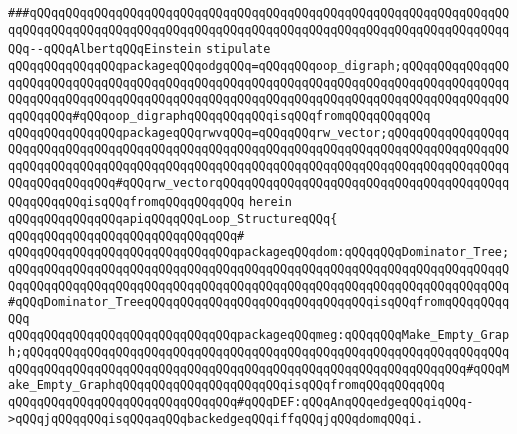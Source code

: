 \verb|###qQQqqQQqqQQqqQQqqQQqqQQqqQQqqQQqqQQqqQQqqQQqqQQqqQQqqQQqqQQqqQQqqQQqqQQqqQQqqQQqqQQqqQQqqQQqqQQqqQQqqQQqqQQqqQQqqQQqqQQqqQQqqQQqqQQqqQQqqQQq--qQQqAlbertqQQqEinstein|\newline
\newline
\newline
\verb|stipulate|\newline
\verb|qQQqqQQqqQQqqQQqpackageqQQqodgqQQq=qQQqqQQqoop_digraph;qQQqqQQqqQQqqQQqqQQqqQQqqQQqqQQqqQQqqQQqqQQqqQQqqQQqqQQqqQQqqQQqqQQqqQQqqQQqqQQqqQQqqQQqqQQqqQQqqQQqqQQqqQQqqQQqqQQqqQQqqQQqqQQqqQQqqQQqqQQqqQQqqQQqqQQqqQQqqQQqqQQq#qQQqoop_digraphqQQqqQQqqQQqisqQQqfromqQQqqQQqqQQq|\newline
\verb|qQQqqQQqqQQqqQQqpackageqQQqrwvqQQq=qQQqqQQqrw_vector;qQQqqQQqqQQqqQQqqQQqqQQqqQQqqQQqqQQqqQQqqQQqqQQqqQQqqQQqqQQqqQQqqQQqqQQqqQQqqQQqqQQqqQQqqQQqqQQqqQQqqQQqqQQqqQQqqQQqqQQqqQQqqQQqqQQqqQQqqQQqqQQqqQQqqQQqqQQqqQQqqQQqqQQqqQQq#qQQqrw_vectorqQQqqQQqqQQqqQQqqQQqqQQqqQQqqQQqqQQqqQQqqQQqqQQqqQQqisqQQqfromqQQqqQQqqQQq|\newline
\verb|herein|\newline
\newline
\newline
\verb|qQQqqQQqqQQqqQQqapiqQQqqQQqLoop_StructureqQQq{|\newline
\verb|qQQqqQQqqQQqqQQqqQQqqQQqqQQqqQQq#|\newline
\verb|qQQqqQQqqQQqqQQqqQQqqQQqqQQqqQQqpackageqQQqdom:qQQqqQQqDominator_Tree;qQQqqQQqqQQqqQQqqQQqqQQqqQQqqQQqqQQqqQQqqQQqqQQqqQQqqQQqqQQqqQQqqQQqqQQqqQQqqQQqqQQqqQQqqQQqqQQqqQQqqQQqqQQqqQQqqQQqqQQqqQQqqQQqqQQqqQQqqQQq#qQQqDominator_TreeqQQqqQQqqQQqqQQqqQQqqQQqqQQqqQQqisqQQqfromqQQqqQQqqQQq|\newline
\verb|qQQqqQQqqQQqqQQqqQQqqQQqqQQqqQQqpackageqQQqmeg:qQQqqQQqMake_Empty_Graph;qQQqqQQqqQQqqQQqqQQqqQQqqQQqqQQqqQQqqQQqqQQqqQQqqQQqqQQqqQQqqQQqqQQqqQQqqQQqqQQqqQQqqQQqqQQqqQQqqQQqqQQqqQQqqQQqqQQqqQQqqQQqqQQqqQQq#qQQqMake_Empty_GraphqQQqqQQqqQQqqQQqqQQqqQQqisqQQqfromqQQqqQQqqQQq|\newline
\newline
\newline
\verb|qQQqqQQqqQQqqQQqqQQqqQQqqQQqqQQq#qQQqDEF:qQQqAnqQQqedgeqQQqiqQQq->qQQqjqQQqqQQqisqQQqaqQQqbackedgeqQQqiffqQQqjqQQqdomqQQqi.|\newline
